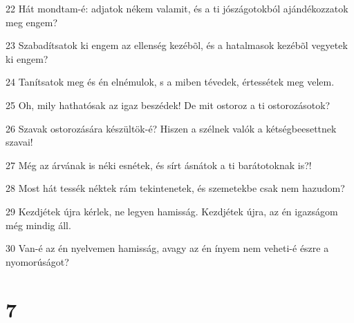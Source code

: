 \par 22 Hát mondtam-é: adjatok nékem valamit, és a ti jószágotokból ajándékozzatok meg engem?
\par 23 Szabadítsatok ki engem az ellenség kezébõl, és a hatalmasok kezébõl vegyetek ki engem?
\par 24 Tanítsatok meg és én elnémulok, s a miben tévedek, értessétek meg velem.
\par 25 Oh, mily hathatósak az igaz beszédek! De mit ostoroz a ti ostorozásotok?
\par 26 Szavak ostorozására készültök-é? Hiszen a szélnek valók a kétségbeesettnek szavai!
\par 27 Még az árvának is néki esnétek, és sírt ásnátok a ti barátotoknak is?!
\par 28 Most hát tessék néktek rám tekintenetek, és szemetekbe csak nem hazudom?
\par 29 Kezdjétek újra kérlek, ne legyen hamisság. Kezdjétek újra, az én igazságom még mindig áll.
\par 30 Van-é az én nyelvemen hamisság, avagy az én ínyem nem veheti-é észre a nyomorúságot?

\chapter{7}

